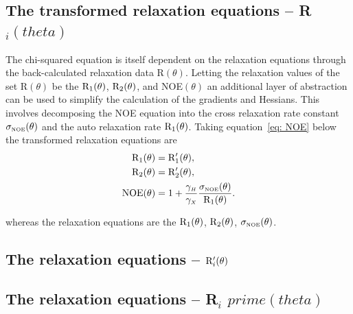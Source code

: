 \begin{htmlonly}
\begin{htmlonly}
\begin{htmlonly}
    \subsection{The transformed relaxation equations -- R$_i(theta)$}
\end{htmlonly}

The chi-squared equation is itself dependent on the relaxation equations through the back-calculated relaxation data R$(\theta)$.  Letting the relaxation values of the set R$(\theta)$ be the $\mathrm{R}_1(\theta)$, $\mathrm{R}_2(\theta)$, and NOE$(\theta)$ an additional layer of abstraction can be used to simplify the calculation of the gradients and Hessians.  This involves decomposing the NOE equation into the cross relaxation rate constant $\sigma_{\scriptscriptstyle \mathrm{NOE}}(\theta)$ and the auto relaxation rate $\mathrm{R}_1(\theta)$.  Taking equation~\eqref{eq: NOE} below the transformed relaxation equations are
\begin{subequations}
\begin{align}
    \mathrm{R}_1(\theta) &= \mathrm{R}_1'(\theta), \\
    \mathrm{R}_2(\theta) &= \mathrm{R}_2'(\theta), \\
    \mathrm{NOE}(\theta)  &= 1 + \frac{\gamma_{\scriptscriptstyle H}}{\gamma_{\scriptscriptstyle X}} \frac{\sigma_{\scriptscriptstyle \mathrm{NOE}}(\theta)}{\mathrm{R}_1(\theta)}.
\end{align}
\end{subequations}

\noindent whereas the relaxation equations are the $\mathrm{R}_1(\theta)$, $\mathrm{R}_2(\theta)$, $\sigma_{\scriptscriptstyle \mathrm{NOE}}(\theta)$.



\begin{latexonly}
    \subsection{The relaxation equations -- $\mathrm{R}_i'(\theta)$}
\end{latexonly}
\begin{htmlonly}
    \subsection{The relaxation equations -- R$_i$ $prime(theta)$}
\end{htmlonly}


\end{htmlonly}
\end{htmlonly}
